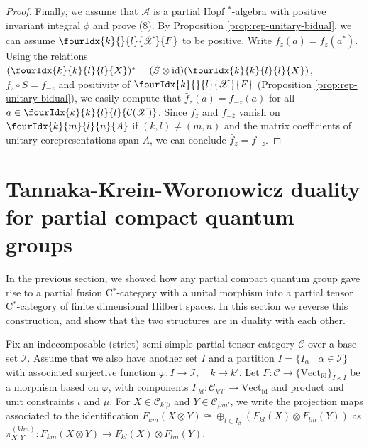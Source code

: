\documentclass[10pt]{article}
\DeclareMathOperator{\fin}{\mathrm{fd}}
\DeclareMathOperator{\id}{id}
\newcommand{\CatC}{\mathcal{C}}
\newcommand{\CatCC}{\mathscr{C}}
\newcommand{\Vect}{\mathrm{Vect}}
\newcommand{\Gr}[5]{\fourIdx{#2}{#4}{#3}{#5}{#1}}%
\theoremstyle{definition}
\numberwithin{equation}{section}
\begin{document}
\begin{proof}
     Finally, we assume that $\mathscr{A}$ is a partial Hopf
     $^*$-algebra with positive invariant integral $\phi$ and prove
     (8).  By Proposition \ref{prop:rep-unitary-bidual}, we can assume
     $\Gr{F}{k}{l}{}{\mathscr{X}}$ to be positive.  Write
     $\bar{f}_z(a) = \overline{f_z(a^*)}$. Using the relations $
     (\Gr{X}{k}{l}{k}{l})^{*}=(S \otimes \id)(\Gr{X}{k}{l}{k}{l})$,
     $f_{z} \circ S=f_{-z}$  and
     positivity of $\Gr{F}{k}{l}{}{\mathscr{X}}$ (Proposition
     \ref{prop:rep-unitary-bidual}), we easily compute that $\bar{f}_z(a) = f_{-\overline{z}}(a)$ for all $a\in
\Gr{\mathcal{C}(\mathscr{X})}{k}{l}{k}{l}$. Since $f_{z}$ and
$f_{-\overline{z}}$ vanish on $\Gr{A}{k}{l}{m}{n}$ if $(k,l)\neq
(m,n)$ and the matrix coefficients of unitary 
corepresentations span $A$, we can conclude $\bar{f}_{z}=f_{-\overline{z}}$.
\end{proof}





\section{Tannaka-Krein-Woronowicz duality for partial compact quantum groups}


In the previous section, we showed how any partial compact quantum group gave rise to a partial fusion C$^*$-category with a unital morphism into a partial tensor C$^*$-category of finite dimensional Hilbert spaces. In this section we reverse this construction, and show that the two structures are in duality with each other. 

Fix an indecomposable (strict) semi-simple partial tensor category $\CatCC$ over a base set $\mathscr{I}$. Assume that we also have another set $I$ and a partition $I = \{I_\alpha\mid \alpha\in \mathscr{I}\}$ with associated surjective function $\varphi:I\rightarrow \mathscr{I}, \quad k\mapsto k'.$ Let $F: \CatCC\rightarrow \{\Vect_{\fin}\}_{I\times I}$ be a morphism based on $\varphi$, with components $F_{kl}:\CatCC_{k'l'}\rightarrow \Vect_{\fin}$ and product and unit constraints $\iota$ and $\mu$.  For $X\in \CatC_{k'\beta}$ and $Y\in \CatC_{\beta m'}$, we write the projection maps associated to the identification $F_{km}(X\otimes Y)\cong \oplus_{l\in I_\beta} \left(F_{kl}(X)\otimes F_{lm}(Y)\right)$ as $\pi^{(klm)}_{X,Y}:F_{km}(X\otimes Y) \rightarrow F_{kl}(X)\otimes F_{lm}(Y).$
\end{document}
